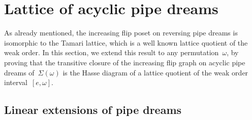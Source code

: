 \documentclass{amsart}
\newtheorem{lemma}[theorem]{Lemma}
\theoremstyle{definition}
\newcommand{\vincent}[1]{\todo[color=blue!30]{#1 \\ \hfill --- V.}}
\newcommand{\contact}{^\#} %
\newcommand{\acyclicPipeDreams}{\Sigma} %
\newcommand{\less}{\vartriangleleft} %
\newcommand{\more}{\vartriangleright} %
\newcommand{\contactLess}[1]{\less_{#1}} %
\newcommand{\contactMore}[1]{\more_{#1}} %
\begin{document}
%




\section{Lattice of acyclic pipe dreams}
\label{sec:latticeAcyclicPipeDreams}

As already mentioned, the increasing flip poset on reversing pipe dreams is isomorphic to the Tamari lattice, which is a well known lattice quotient of the weak order.
In this section, we extend this result to any permutation~$\omega$, by proving that the transitive closure of the increasing flip graph on acyclic pipe dreams of~$\acyclicPipeDreams(\omega)$ is the Hasse diagram of a lattice quotient of the weak order interval~$[e,\omega]$.


\subsection{Linear extensions of pipe dreams}
\label{subsec:linearExtensions}
\end{document}
